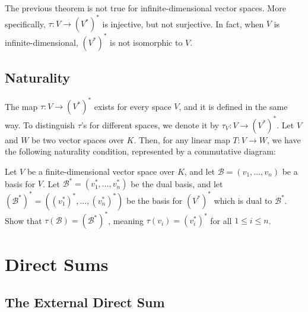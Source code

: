 \begin{remark}
  The previous theorem is not true for infinite-dimensional vector spaces. More specifically, $\tau \colon V \to (V^*)^*$ is injective, but not surjective. In fact, when $V$ is infinite-dimensional, $(V^*)^*$ is not isomorphic to $V$.
\end{remark}

\subsection{Naturality}
The map $\tau \colon V \to (V^*)^*$ exists for every space $V$, and it is defined in the same way. To distinguish $\tau$'s for different spaces, we denote it by $\tau_V \colon V \to (V^*)^*$. Let $V$ and $W$ be two vector spaces over $K$. Then, for any linear map $T \colon V \to W$, we have the following naturality condition, represented by a commutative diagram:

\begin{center}
\end{center}

\begin{exercise}
  Let $V$ be a finite-dimensional vector space over $K$, and let $\mathcal{B} = (v_1, \dots, v_n)$ be a basis for $V$. Let $\mathcal{B}^* = (v_1^*, \dots, v_n^*)$ be the dual basis, and let $(\mathcal{B}^*)^* = ((v_1^*)^*, \dots, (v_n^*)^*)$ be the basis for $(V^*)^*$ which is dual to $\mathcal{B}^*$. Show that $\tau(\mathcal{B}) = (\mathcal{B}^*)^*$, meaning $\tau(v_i) = (v_i^*)^*$ for all $1 \leq i \leq n$.
\end{exercise}

\setcounter{section}{1}
\section{Direct Sums}

\subsection{The External Direct Sum}

